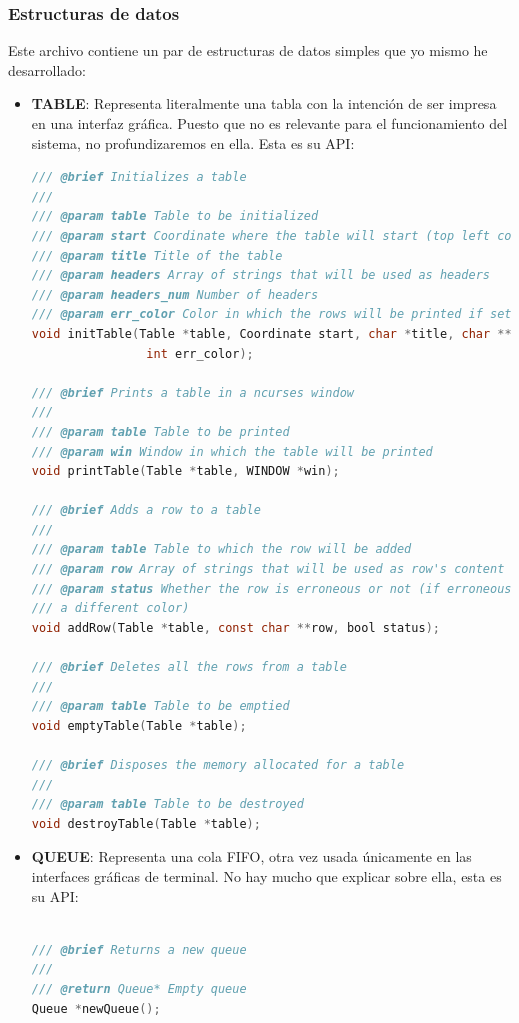 \documentclass[a4paper,12pt]{article}
\begin{document}
\subsubsection{Estructuras de datos}
Este archivo contiene un par de estructuras de datos simples que yo mismo he desarrollado:
\begin{itemize}
  \item \textbf{TABLE}: Representa literalmente una tabla con la intención de ser impresa en una interfaz gráfica. Puesto que
        no es relevante para el funcionamiento del sistema, no profundizaremos en ella. Esta es su API:
        \begin{lstlisting}[language=C]
/// @brief Initializes a table
///
/// @param table Table to be initialized
/// @param start Coordinate where the table will start (top left corner)
/// @param title Title of the table
/// @param headers Array of strings that will be used as headers
/// @param headers_num Number of headers
/// @param err_color Color in which the rows will be printed if set as erroneous
void initTable(Table *table, Coordinate start, char *title, char **headers, int headers_num,
                int err_color);

/// @brief Prints a table in a ncurses window
///
/// @param table Table to be printed
/// @param win Window in which the table will be printed
void printTable(Table *table, WINDOW *win);

/// @brief Adds a row to a table
///
/// @param table Table to which the row will be added
/// @param row Array of strings that will be used as row's content
/// @param status Whether the row is erroneous or not (if erroneous, the row will be printed in
/// a different color)
void addRow(Table *table, const char **row, bool status);

/// @brief Deletes all the rows from a table
///
/// @param table Table to be emptied
void emptyTable(Table *table);

/// @brief Disposes the memory allocated for a table
///
/// @param table Table to be destroyed
void destroyTable(Table *table);
        \end{lstlisting}
  \item \textbf{QUEUE}: Representa una cola FIFO, otra vez usada únicamente en las interfaces gráficas de terminal. No hay mucho que explicar sobre ella, esta es su API:
        \begin{lstlisting}[language=C]

/// @brief Returns a new queue
///
/// @return Queue* Empty queue
Queue *newQueue();


\end{lstlisting}
\end{itemize}
\end{document}
